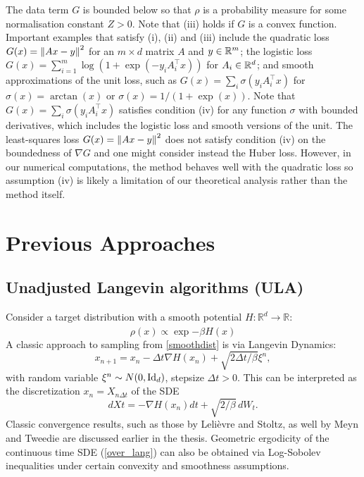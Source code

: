 \documentclass[11pt, twoside]{report}
\begin{document}
The data term $G$ is bounded below so that $\rho$ is a probability measure for some normalisation constant $Z>0$. Note that (iii) holds if $G$ is a convex function. Important examples that satisfy (i), (ii) and (iii) include the quadratic loss $G(x) = \left\lVert A x - y\right\rVert^2$ for an $m\times d$ matrix $A$ and $y\in \mathbb{R}^m$; the logistic loss $G(x)=\sum_{i=1}^m \log( 1+ \exp(-y_i A_i^\top x) )$ for $A_i\in\mathbb{R}^d$; and smooth approximations of the unit loss,  such as $G(x) = \sum_i \sigma(y_i A_i^\top x)$ for $\sigma(x)=\arctan(x)$ or $\sigma(x)=1/(1+\exp(x))$.
Note that  $G(x) = \sum_i \sigma(y_i A_i^\top x)$  satisfies condition (iv) for any function $\sigma$ with bounded derivatives, which includes the logistic loss and smooth versions of the unit.  The least-squares loss $G(x)=\left\lVert Ax-y\right\rVert^2$ does not satisfy condition (iv) on the boundedness of $\nabla G$ and one might consider instead the Huber loss. However, in our numerical computations, the method behaves well with the quadratic loss so assumption (iv) is likely a limitation of our theoretical analysis rather than the method itself.
\section{Previous Approaches}
\subsection{Unadjusted Langevin algorithms (ULA)}
Consider a target distribution with a smooth potential $H: \mathbb{R}^d \xrightarrow[]{} \mathbb{R}$:
\begin{equation} \label{smoothdist}
    \rho(x) \propto \exp{-\beta H(x)}
\end{equation}
A classic approach to sampling from \ref{smoothdist} is via Langevin Dynamics:
\begin{equation}
    x_{n+1} = x_n - \Delta t\nabla H(x_n) + \sqrt{2\Delta t/\beta} \xi^n,
\end{equation}
with random variable $\xi^n \sim N(0,\mathrm{Id}_d)$, stepsize $\Delta t >0$. This can be interpreted as the discretization $x_n = X_{n \Delta t}$ of the SDE
\begin{equation} \label{over_lang}
    dXt = -\nabla H(x_n) dt + \sqrt{2/\beta} \, dW_t.
\end{equation}
Classic convergence results, such as those by Leli{\`e}vre and Stoltz, as well by Meyn and Tweedie \cite{Meyn2012-oq} are discussed earlier in the thesis. Geometric ergodicity of the continuous time SDE (\ref{over_lang}) can also be obtained via Log-Sobolev inequalities under certain convexity and smoothness assumptions.
\end{document}
